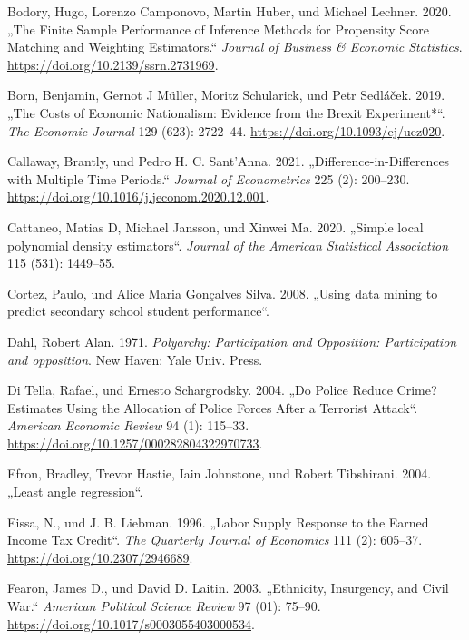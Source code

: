 \documentclass[
  a4paper,
  DIV=11,
  oneside]{scrreprt}
\newlength{\cslhangindent}
\newenvironment{CSLReferences}[2] %
 {\begin{list}{}{%
  \setlength{\itemindent}{0pt}
  \setlength{\leftmargin}{0pt}
  \setlength{\parsep}{0pt}
  \ifodd #1
   \setlength{\leftmargin}{\cslhangindent}
   \setlength{\itemindent}{-1\cslhangindent}
  \fi
  \setlength{\itemsep}{#2\baselineskip}}}
 {\end{list}}
\begin{document}
\begin{CSLReferences}{1}{0}
Bodory, Hugo, Lorenzo Camponovo, Martin Huber, und Michael Lechner.
2020. {„The Finite Sample Performance of Inference Methods for
Propensity Score Matching and Weighting Estimators.``} \emph{Journal of
Business \& Economic Statistics}.
\url{https://doi.org/10.2139/ssrn.2731969}.

Born, Benjamin, Gernot J Müller, Moritz Schularick, und Petr Sedláček.
2019. {„The Costs of Economic Nationalism: Evidence from the Brexit
Experiment*``}. \emph{The Economic Journal} 129 (623): 2722--44.
\url{https://doi.org/10.1093/ej/uez020}.

Callaway, Brantly, und Pedro H. C. Sant'Anna. 2021.
{„Difference-in-Differences with Multiple Time Periods.``} \emph{Journal
of Econometrics} 225 (2): 200--230.
\url{https://doi.org/10.1016/j.jeconom.2020.12.001}.

Cattaneo, Matias D, Michael Jansson, und Xinwei Ma. 2020. {„Simple local
polynomial density estimators``}. \emph{Journal of the American
Statistical Association} 115 (531): 1449--55.

Cortez, Paulo, und Alice Maria Gonçalves Silva. 2008. {„Using data
mining to predict secondary school student performance``}.

Dahl, Robert Alan. 1971. \emph{Polyarchy: Participation and Opposition:
Participation and opposition}. New Haven: Yale Univ. Press.

Di Tella, Rafael, und Ernesto Schargrodsky. 2004. {„Do Police Reduce
Crime? Estimates Using the Allocation of Police Forces After a Terrorist
Attack``}. \emph{American Economic Review} 94 (1): 115--33.
\url{https://doi.org/10.1257/000282804322970733}.

Efron, Bradley, Trevor Hastie, Iain Johnstone, und Robert Tibshirani.
2004. {„Least angle regression``}.

Eissa, N., und J. B. Liebman. 1996. {„Labor Supply Response to the
Earned Income Tax Credit``}. \emph{The Quarterly Journal of Economics}
111 (2): 605--37. \url{https://doi.org/10.2307/2946689}.

Fearon, James D., und David D. Laitin. 2003. {„Ethnicity, Insurgency,
and Civil War.``} \emph{American Political Science Review} 97 (01):
75--90. \url{https://doi.org/10.1017/s0003055403000534}.


\end{CSLReferences}
\end{document}
